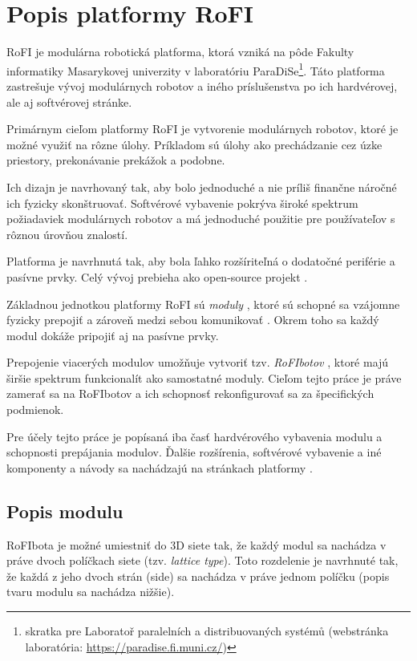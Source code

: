 \documentclass[
  printed, %
  oneside, %
  notable,   %
  nolof,     %
  nolot,     %
]{fithesis3}
\begin{document}
\chapter{Popis platformy RoFI}
\label{sec:platform}
RoFI je modulárna robotická platforma, ktorá vzniká na pôde Fakulty informatiky Masarykovej univerzity v laboratóriu ParaDiSe\footnote{skratka pre Laboratoř paralelních a distribuovaných systémů (webstránka laboratória: \url{https://paradise.fi.muni.cz/})}. Táto platforma zastrešuje vývoj modulárnych robotov a iného príslušenstva po ich hardvérovej, ale aj softvérovej stránke. 

Primárnym cieľom platformy RoFI je vytvorenie modulárnych robotov, ktoré je možné využiť na rôzne úlohy. Príkladom sú úlohy ako prechádzanie cez úzke priestory, prekonávanie prekážok a podobne. 

Ich dizajn je navrhovaný tak, aby bolo jednoduché a nie príliš finančne náročné ich fyzicky skonštruovať. Softvérové vybavenie pokrýva široké spektrum požiadaviek modulárnych robotov a má jednoduché použitie pre používateľov s rôznou úrovňou znalostí. 

Platforma je navrhnutá tak, aby bola ľahko rozšíriteľná o dodatočné periférie a pasívne prvky. Celý vývoj prebieha ako open-source projekt \cite{rofiGit}. 

Základnou jednotkou platformy RoFI sú \textit{moduly} \cite{mrazekMasterThesis}, ktoré sú schopné sa vzájomne fyzicky prepojiť a zároveň medzi sebou komunikovať \cite{rofiCom}. Okrem toho sa každý modul dokáže pripojiť aj na pasívne prvky. 

Prepojenie viacerých modulov umožňuje vytvoriť tzv. \textit{RoFIbotov} \cite{rofiWeb}, ktoré majú širšie spektrum funkcionalít ako samostatné moduly. Cieľom tejto práce je práve zamerať sa na RoFIbotov a ich schopnosť rekonfigurovať sa za špecifických podmienok. 

Pre účely tejto práce je popísaná iba časť hardvérového vybavenia modulu a schopnosti prepájania modulov. Ďalšie rozšírenia, softvérové vybavenie a iné komponenty a návody sa nachádzajú na stránkach platformy \cite{rofiWeb}.

\section{Popis modulu}
\label{sec:moduleSpec}
RoFIbota je možné umiestniť do 3D siete tak, že každý modul sa nachádza v práve dvoch políčkach siete (tzv. \textit{lattice type}). Toto rozdelenie je navrhnuté tak, že každá z jeho dvoch strán (side) sa nachádza v práve jednom políčku (popis tvaru modulu sa nachádza nižšie). 
\end{document}
